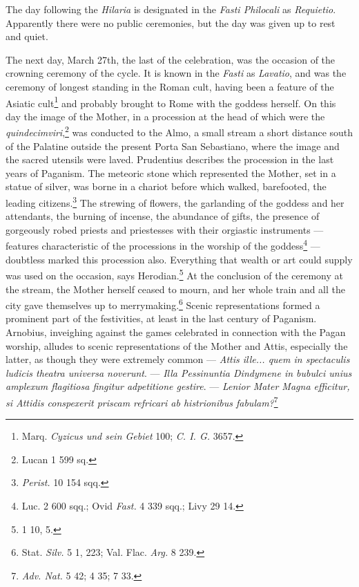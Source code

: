 \documentclass[a4paper, 11pt, oneside, polutonikogreek, english]{article}
\begin{document}
The day following the \emph{Hilaria} is designated in the \emph{Fasti Philocali} as \emph{Requietio}. Apparently there were no public ceremonies, but the day was given up to rest and quiet.

The next day, March 27th, the last of the celebration, was the occasion of the crowning ceremony of the cycle. It is known in the \emph{Fasti} as \emph{Lavatio}, and was the ceremony of longest standing in the Roman cult, having been a feature of the Asiatic cult\footnote{Marq. \emph{Cyzicus und sein Gebiet} 100; \emph{C. I. G.} 3657.} and probably brought to Rome with the goddess herself. On this day the image of the Mother, in a procession at the head of which were the \emph{quindecimviri},\footnote{Lucan 1 599 sq.} was conducted to the Almo, a small stream a short distance south of the Palatine outside the present Porta San Sebastiano, where the image and the sacred utensils were laved. Prudentius describes the procession in the last years of Paganism. The meteoric stone which represented the Mother, set in a statue of silver, was borne in a chariot before which walked, barefooted, the leading citizens.\footnote{\emph{Perist.} 10 154 sqq.} The strewing of flowers, the garlanding of the goddess and her attendants, the burning of incense, the abundance of gifts, the presence of gorgeously robed priests and priestesses with their orgiastic instruments --- features characteristic of the processions in the worship of the goddess\footnote{Luc. 2 600 sqq.; Ovid \emph{Fast.} 4 339 sqq.; Livy 29 14.} --- doubtless marked this procession also. Everything that wealth or art could supply was used on the occasion, says Herodian.\footnote{1 10, 5.} At the conclusion of the ceremony at the stream, the Mother herself ceased to mourn, and her whole train and all the city gave themselves up to merrymaking.\footnote{Stat. \emph{Silv.} 5 1, 223; Val. Flac. \emph{Arg.} 8 239.} Scenic representations formed a prominent part of the festivities, at least in the last century of Paganism. Arnobius, inveighing against the games celebrated in connection with the Pagan worship, alludes to scenic representations of the Mother and Attis, especially the latter, as though they were extremely common --- \emph{Attis ille... quem in spectaculis ludicis theatra universa noverunt}. --- \emph{Illa Pessinuntia Dindymene in bubulci unius amplexum flagitiosa fingitur adpetitione gestire}. --- \emph{Lenior Mater Magna efficitur, si Attidis conspexerit priscam refricari ab histrionibus fabulam?}\footnote{\emph{Adv. Nat.} 5 42; 4 35; 7 33.}
\end{document}
